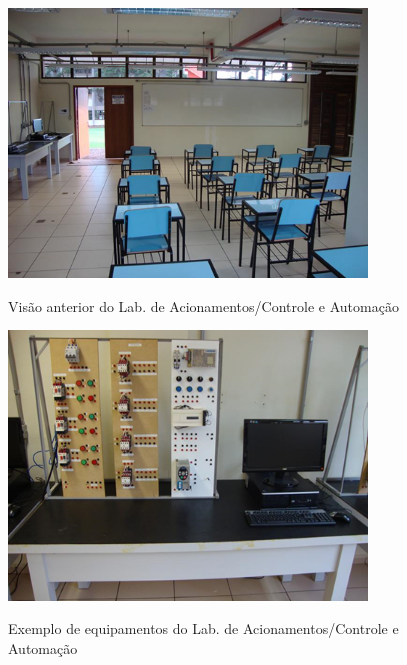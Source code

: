 \begin{figure}[!htb]
    \centering
    \caption{Visão anterior do Lab. de Acionamentos/Controle e Automação}
    \includegraphics[width=0.85\textwidth]{Caps/Figs/lab008b.png}
    \fonte{\utf}
    \label{fig:lab008b}
\end{figure}

\begin{figure}[!htb]
    \centering
    \caption{Exemplo de equipamentos do Lab. de Acionamentos/Controle e Automação}
    \includegraphics[width=0.85\textwidth]{Caps/Figs/lab008c.png}
    \fonte{\utf}
    \label{fig:lab008c}
\end{figure}